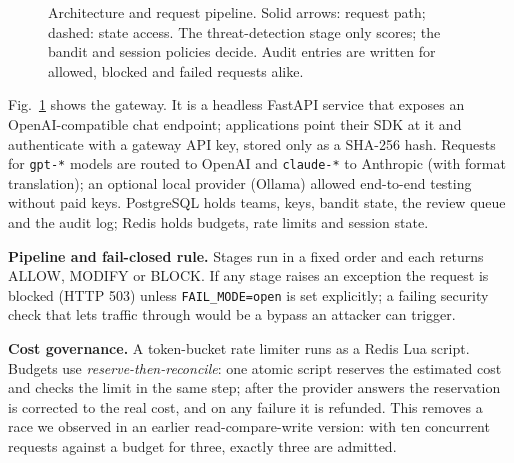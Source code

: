 \documentclass[conference]{IEEEtran}
\begin{document}
\begin{figure}[t]
{}
\caption{Architecture and request pipeline. Solid arrows: request path;
dashed: state access. The threat-detection stage only scores; the bandit
and session policies decide. Audit entries are written for allowed,
blocked and failed requests alike.}
\label{fig:arch}
\end{figure}

Fig.~\ref{fig:arch} shows the gateway. It is a headless FastAPI service
that exposes an OpenAI-compatible chat endpoint; applications point their
SDK at it and authenticate with a gateway API key, stored only as a SHA-256
hash. Requests for \texttt{gpt-*} models are routed to OpenAI and
\texttt{claude-*} to Anthropic (with format translation); an optional local
provider (Ollama) allowed end-to-end testing without paid keys. PostgreSQL
holds teams, keys, bandit state, the review queue and the audit log; Redis
holds budgets, rate limits and session state.

\textbf{Pipeline and fail-closed rule.} Stages run in a fixed order and
each returns ALLOW, MODIFY or BLOCK. If any stage raises an exception the
request is blocked (HTTP 503) unless \texttt{FAIL\_MODE=open} is set
explicitly; a failing security check that lets traffic through would be a
bypass an attacker can trigger.

\textbf{Cost governance.} A token-bucket rate limiter runs as a Redis Lua
script. Budgets use \emph{reserve-then-reconcile}: one atomic script
reserves the estimated cost and checks the limit in the same step; after
the provider answers the reservation is corrected to the real cost, and on
any failure it is refunded. This removes a race we observed in an earlier
read-compare-write version: with ten concurrent requests against a budget
for three, exactly three are admitted.
\end{document}
